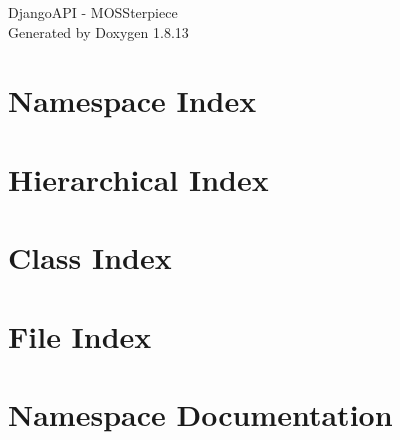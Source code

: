 \documentclass[twoside]{book}
\newcommand{\+}{\discretionary{\mbox{\scriptsize$\hookleftarrow$}}{}{}}
\newcommand{\clearemptydoublepage}{%
  \newpage{\pagestyle{empty}\cleardoublepage}%
}
\begin{document}
\hypersetup{pageanchor=false,
             bookmarksnumbered=true,
             pdfencoding=unicode
            }
\begin{titlepage}
\vspace*{7cm}
\begin{center}%
{\Large Django\+A\+PI -\/ M\+O\+S\+Sterpiece }\\
\vspace*{1cm}
{\large Generated by Doxygen 1.8.13}\\
\end{center}
\end{titlepage}
\clearemptydoublepage
{}
\tableofcontents
\clearemptydoublepage
{}
\hypersetup{pageanchor=true}

\chapter{Namespace Index}

\chapter{Hierarchical Index}

\chapter{Class Index}

\chapter{File Index}

\chapter{Namespace Documentation}





















\end{document}
